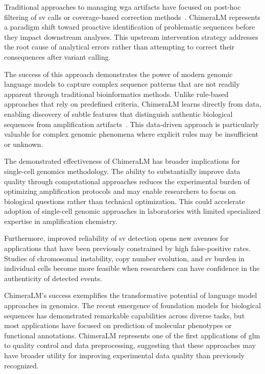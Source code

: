 \documentclass[pdflatex,sn-nature]{sn-jnl}%
\theoremstyle{thmstyleone}%
\theoremstyle{thmstyletwo}%
\theoremstyle{thmstylethree}%
\begin{document}
Traditional approaches to managing \gls{wga} artifacts have focused on post-hoc filtering of \gls{sv} calls or coverage-based correction methods~\cite{kiguchi2021long, lu2023exploration}.
ChimeraLM represents a paradigm shift toward proactive identification of problematic sequences before they impact downstream analyses.
This upstream intervention strategy addresses the root cause of analytical errors rather than attempting to correct their consequences after variant calling.

The success of this approach demonstrates the power of modern genomic language models to capture complex sequence patterns that are not readily apparent through traditional bioinformatics methods.
Unlike rule-based approaches that rely on predefined criteria, ChimeraLM learns directly from data, enabling discovery of subtle features that distinguish authentic biological sequences from amplification artifacts~\cite{lu2023exploration, agyabeng2025evaluating, nguyen2023hyenadna}.
This data-driven approach is particularly valuable for complex genomic phenomena where explicit rules may be insufficient or unknown.

The demonstrated effectiveness of ChimeraLM has broader implications for single-cell genomics methodology.
The ability to substantially improve data quality through computational approaches reduces the experimental burden of optimizing amplification protocols and may enable researchers to focus on biological questions rather than technical optimization.
This could accelerate adoption of single-cell genomic approaches in laboratories with limited specialized expertise in amplification chemistry.

Furthermore, improved reliability of \gls{sv} detection opens new avenues for applications that have been previously constrained by high false-positive rates.
Studies of chromosomal instability, copy number evolution, and \gls{sv} burden in individual cells become more feasible when researchers can have confidence in the authenticity of detected events.

ChimeraLM's success exemplifies the transformative potential of language model approaches in genomics.
The recent emergence of foundation models for biological sequences has demonstrated remarkable capabilities across diverse tasks, but most applications have focused on prediction of molecular phenotypes or functional annotations.
ChimeraLM represents one of the first applications of \gls{glm} to quality control and data preprocessing, suggesting that these approaches may have broader utility for improving experimental data quality than previously recognized.
\end{document}
